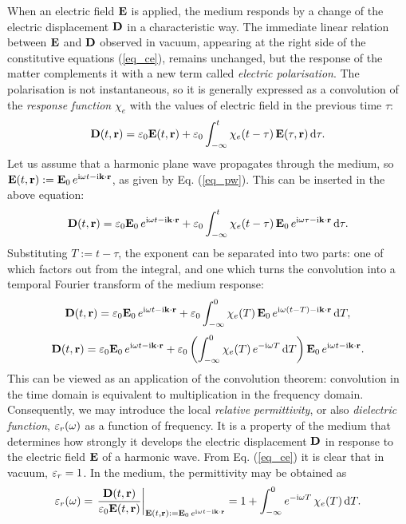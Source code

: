 When an electric field $\mathbf{E}$ is applied, the medium responds by a change of the electric displacement $\mathbf{D}$ in a characteristic way. 
The immediate linear relation between $\mathbf{E}$ and $\mathbf{D}$ observed in vacuum, appearing at the right side of the constitutive equations (\ref{eq_ce}), remains unchanged, but the response of the matter complements it with a new term called \textit{electric polarisation}. The polarisation is not instantaneous, so it is generally expressed as a convolution of the \textit{response function} $\chi_e$ with the values of electric field in the previous time $\tau$:
\begin{equation} \mathbf{D}(t,{\mathbf{r}}) = \varepsilon_0 \mathbf{E}(t,{\mathbf{r}}) + \varepsilon_0 \int_{-\infty}^{t}\chi_e(t-\tau)\, \mathbf{E}(\tau,{\mathbf{r}})\,\mbox{d}\tau. \label{eq_loc_chi_convol}\end{equation}
Let us assume that a harmonic plane wave propagates through the medium, so $\mathbf{E}(t, {\mathbf{r}}) := \mathbf{E}_0 \, e^{{\mathrm i}\omega t - {\mathrm i}{\mathbf{k}}\cdot{\mathbf{r}}}$, as given by Eq. (\ref{eq_pw}). This can be inserted in the above equation:
\begin{equation} \mathbf{D}(t,{\mathbf{r}}) = \varepsilon_0 \mathbf{E}_0 \, e^{{\mathrm i}\omega t - {\mathrm i}{\mathbf{k}}\cdot{\mathbf{r}}} + \varepsilon_0 \int_{-\infty}^{t} \chi_e(t-\tau) \, \mathbf{E}_0 \, e^{{\mathrm i}\omega \tau - {\mathrm i}{\mathbf{k}}\cdot{\mathbf{r}}} \,\mbox{d}\tau. \label{eq_chi_convol_harm}\end{equation}
	Substituting $T:=t-\tau$, the exponent can be separated into two parts: one of which factors out from the integral, and one which turns the convolution into a temporal Fourier transform of the medium response:
$$				 \mathbf{D}(t,{\mathbf{r}}) = \varepsilon_0 \mathbf{E}_0 \, e^{{\mathrm i}\omega t - {\mathrm i}{\mathbf{k}}\cdot{\mathbf{r}}} + \varepsilon_0 \int_{-\infty}^{0} \chi_e(T) \, \mathbf{E}_0 \, e^{{\mathrm i}\omega (t - T) - {\mathrm i}{\mathbf{k}}\cdot{\mathbf{r}}} \,\mbox{d}T,$$
$$				 \mathbf{D}(t,{\mathbf{r}}) = \varepsilon_0 \mathbf{E}_0 \, e^{{\mathrm i}\omega t - {\mathrm i}{\mathbf{k}}\cdot{\mathbf{r}}} + \varepsilon_0 \left( \int_{-\infty}^{0} \chi_e(T)  \, e^{-{\mathrm i}\omega T}\,\mbox{d}T  \right) \mathbf{E}_0 \, e^{{\mathrm i}\omega t - {\mathrm i}{\mathbf{k}}\cdot{\mathbf{r}}}.$$
This can be viewed as an application of the convolution theorem: convolution in the time domain is equivalent to multiplication in the frequency domain.  %
Consequently, we may introduce the local \textit{relative permittivity}, or also \textit{dielectric function}, $\varepsilon_r(\omega)$ as a function of frequency. It is a property of the medium that determines how strongly it develops the electric displacement $\mathbf{D}$ in response to the electric field $\mathbf{E}$ of a harmonic wave.
From Eq. (\ref{eq_ce}) it is clear that in vacuum,  $\varepsilon_r = 1$. In the medium, the permittivity may be obtained as %
\begin{equation}  \varepsilon_r(\omega) = \left.\frac{\mathbf{D}(t,{\mathbf{r}})}{\varepsilon_0 \mathbf{E}(t,{\mathbf{r}})} \right|_{\mathbf{E}(t, {\mathbf{r}}) := \mathbf{E}_0 \, e^{{\mathrm i}\omega t - {\mathrm i}{\mathbf{k}}\cdot{\mathbf{r}}}} = 1 + \int_{-\infty}^{0} e^{-{\mathrm i}\omega T} \,\chi_e(T) \,\mbox{d}T. \label{eq_eps_loc}\end{equation}


